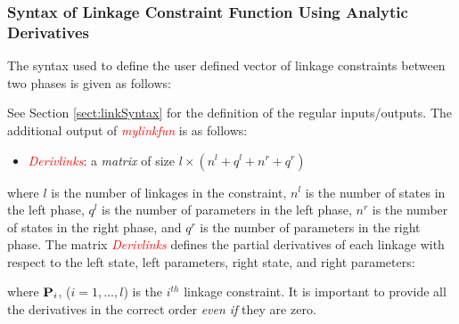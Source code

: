 \documentclass[10pt]{article}
\newcommand{\slred}[1]{\textcolor{red}{\sl #1}}
\begin{document}
\normalsize

\subsubsection{Syntax of Linkage Constraint Function Using Analytic Derivatives}

The syntax used to define the user defined vector of linkage
constraints between two phases is given as follows:
\begin{center}
\end{center}
See Section \ref{sect:linkSyntax} for the definition of the regular inputs/outputs. The additional output of \slred{mylinkfun} is as follows:
\begin{itemize}
  \item \slred{Derivlinks}: a {\em matrix} of size $l\times (n^l+q^l+n^r+q^r)$
\end{itemize}
where $l$ is the number of linkages in the constraint, $n^l$ is the number of states in the left phase, $q^l$ is the number of parameters in the left phase, $n^r$ is the number of states in the right phase, and $q^r$ is the number of parameters in the right phase. The matrix \slred{Derivlinks} defines the partial derivatives of each linkage with respect to the left state, left parameters, right state, and right parameters:
\begin{center}
\end{center}
where $\mathbf{P}_i$, ($i = 1,\ldots,l$) is the $i^{th}$ linkage constraint. It is important to provide all the derivatives in the correct order {\em even if} they are zero.
\end{document}
